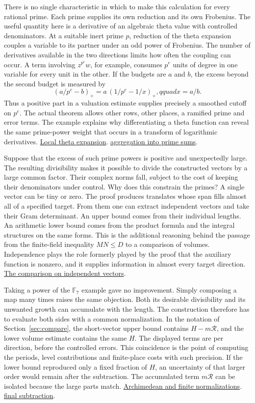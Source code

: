 \documentclass[11pt,letterpaper]{article}
\newcommand{\sref}[2]{\href{https://github.com/VladimirReshetnikov/ProveIt/blob/d8415e76ad850651f8c0083afe689dd9f4a45a10/Analysis/GeneralizedRiemannHypothesis/vendor/grh-lean/grh/src/#1.lean}{#2}}
\begin{document}
There is no single characteristic in which to make this calculation for every rational prime. Each prime supplies its own reduction and its own Frobenius. The useful quantity here is a derivative of an algebraic theta value with controlled denominators. At a suitable inert prime \(p\), reduction of the theta expansion couples a variable to its partner under an odd power of Frobenius. The number of derivatives available in the two directions limits how often the coupling can occur. A term involving \(z^{p^e}w\), for example, consumes \(p^e\) units of degree in one variable for every unit in the other. If the budgets are \(a\) and \(b\), the excess beyond the second budget is measured by
\[
                   (a/p^e-b)_+
                  = a\,(1/p^e-1/x)_+,qquad x=a/b .
\]
Thus a positive part in a valuation estimate supplies precisely a smoothed cutoff on \(p^e\). The actual theorem allows other rows, other places, a ramified prime and error terms. The example explains why differentiating a theta function can reveal the same prime-power weight that occurs in a transform of logarithmic derivatives. \sref{New/Derivatives/Vacuum/Divisibility}{Local theta expansion}. \sref{New/Reduction/PrimeSums}{aggregation into prime sums}.

Suppose that the excess of such prime powers is positive and unexpectedly large. The resulting divisibility makes it possible to divide the constructed vectors by a large common factor. Their complex norms fall, subject to the cost of keeping their denominators under control. Why does this constrain the primes? A single vector can be tiny or zero. The proof produces translates whose span fills almost all of a specified target. From them one can extract independent vectors and take their Gram determinant. An upper bound comes from their individual lengths. An arithmetic lower bound comes from the product formula and the integral structures on the same forms. This is the additional reasoning behind the passage from the finite-field inequality \(MN\le D\) to a comparison of volumes. Independence plays the role formerly played by the proof that the auxiliary function is nonzero, and it supplies information in almost every target direction. \sref{New/Reduction/MainInequality}{The comparison on independent vectors}.

Taking a power of the \(\mathbb F_7\) example gave no improvement. Simply composing a map many times raises the same objection. Both its desirable divisibility and its unwanted growth can accumulate with the length. The construction therefore has to evaluate both sides with a common normalization. In the notation of Section~\ref{sec:compare}, the short-vector upper bound contains \(H-m\mathcal R\), and the lower volume estimate contains the same \(H\). The displayed terms are per direction, before the controlled errors. This coincidence is the point of computing the periods, level contributions and finite-place costs with such precision. If the lower bound reproduced only a fixed fraction of \(H\), an uncertainty of that larger order would remain after the subtraction. The accumulated term \(m\mathcal R\) can be isolated because the large parts match. \sref{New/UpperBound/Size/ArchimedeanSize}{Archimedean and finite normalizations}. \sref{New/Reduction/MainInequality}{final subtraction}.
\end{document}
